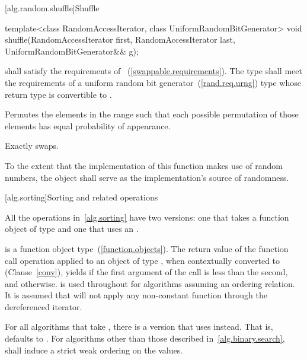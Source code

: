 [alg.random.shuffle]{Shuffle}

%
\begin{itemdecl}
template<class RandomAccessIterator, class UniformRandomBitGenerator>
  void shuffle(RandomAccessIterator first,
               RandomAccessIterator last,
               UniformRandomBitGenerator&& g);
\end{itemdecl}

\begin{itemdescr}
\pnum
\requires
{} shall satisfy the requirements of
~(\ref{swappable.requirements}).
The type
shall meet the requirements of a
uniform random bit generator~(\ref{rand.req.urng}) type whose return type is
convertible to
.

\pnum
\effects
Permutes the elements in the range
such that each possible permutation of those elements has equal probability of appearance.

\pnum
\complexity
Exactly
swaps.

\pnum
\remarks
To the extent that the implementation of this function makes use of random
numbers, the object  shall serve as the implementation's source of
randomness.

\end{itemdescr}

[alg.sorting]{Sorting and related operations}

\pnum
All the operations in~\ref{alg.sorting} have two versions: one that takes a function object of type
and one that uses an
.

\pnum
{}
is a function object
type~(\ref{function.objects}). The return value of the function call operation applied to
an object of type , when contextually converted to
 (Clause~\ref{conv}),
yields  if the first argument of the call
is less than the second, and
otherwise.
is used throughout for algorithms assuming an ordering relation.
It is assumed that
will not apply any non-constant function through the dereferenced iterator.

\pnum
For all algorithms that take
,
there is a version that uses
instead.
That is,
defaults to
.
For algorithms other than those described in~\ref{alg.binary.search},
 shall induce a strict weak ordering on the values.

